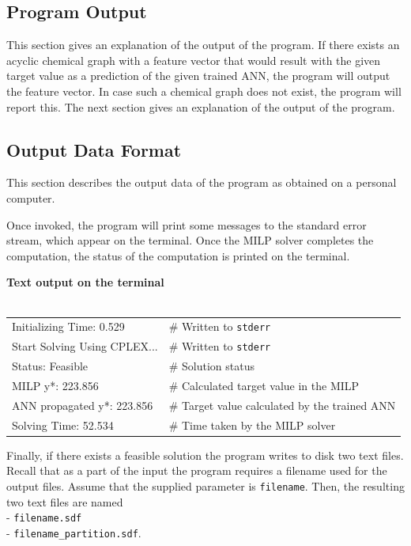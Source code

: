 \documentclass[11pt, titlepage, dvipdfmx, twoside]{article}
\begin{document}
\subsection{Program Output}
\label{sec:section3_3}

This section gives an explanation of the output of the program.
If there exists an acyclic chemical graph with a feature vector that
would result with the given target value as a prediction of
the given trained ANN, the program will output the feature vector.
In case such a chemical graph does not exist, the program will report this.
The next section gives an explanation of the output of the program.


\subsection{Output Data Format}
\label{sec:section3_4}

This section describes the output data of the program as
obtained on a personal computer.

Once invoked, the program will print some messages to the standard error
stream, which appear on the terminal.
Once the MILP solver completes the computation,
the status of the computation is printed on the terminal.

\bigskip

\begin{oframed}
{\bf Text output on the terminal}\\\\
\begin{tabular}{l l}
 Initializing Time: 0.529                &         \# Written to {\tt stderr} \\
Start Solving Using CPLEX...      &       \# Written to {\tt stderr} \\
Status: Feasible 				&       \# Solution status \\
MILP y*: 223.856 				&      \# Calculated target value in the MILP  \\
ANN propagated y*: 223.856     &      \# Target value calculated by the trained ANN  \\
Solving Time: 52.534                     &      \# Time taken by the MILP solver \\
\end{tabular}



\end{oframed}

Finally, if there exists a feasible solution the program writes to disk two text files.
Recall that as a part of the input the program requires a filename
used for the output files. 
Assume that the supplied parameter is {\tt filename}.
Then, the resulting two text files are named \\
- {\tt filename.sdf} \\
- {\tt filename\_partition.sdf}. 
\end{document}
